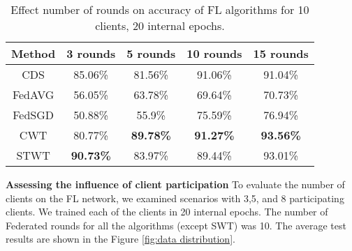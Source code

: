 \begin{table}[h!]
\centering
\setlength{\tabcolsep}{3.5pt}
\renewcommand\arraystretch{1.12}
\caption{ \small Effect number of rounds on accuracy of FL algorithms for 10 clients, 20 internal epochs.}
\begin{tabular}{| *{5}{c|} }

\hline

Method & 3 rounds & 5 rounds & 10 rounds & 15 rounds
\\
 \hline
CDS
 &85.06\% &81.56\% & 91.06\% & 91.04\% 
\\
\hline
FedAVG
 & 56.05\%  &63.78\%&69.64\%&70.73\% \\

 \hline
 FedSGD
 &  50.88\% & 55.9\% &75.59\% & 76.94\%\\
\hline  
CWT
 &  80.77\% & \textbf{89.78\%} &\textbf{91.27\%}& \textbf{93.56\%}\\



\hline  
STWT
 &  \textbf{90.73\%} & 83.97\% &89.44\% & 93.01\%\\

 
  \hline

\end{tabular}
\label{number_of_rounds} 
\end{table}


\textbf{Assessing the influence of client participation}
To evaluate the number of clients on the FL network, we examined scenarios with 3,5, and 8 participating clients. We trained each of the clients in 20 internal epochs. The number of Federated rounds for all the algorithms (except SWT) was 10.
The average test results are shown in the Figure \ref{fig:data distribution}. 

